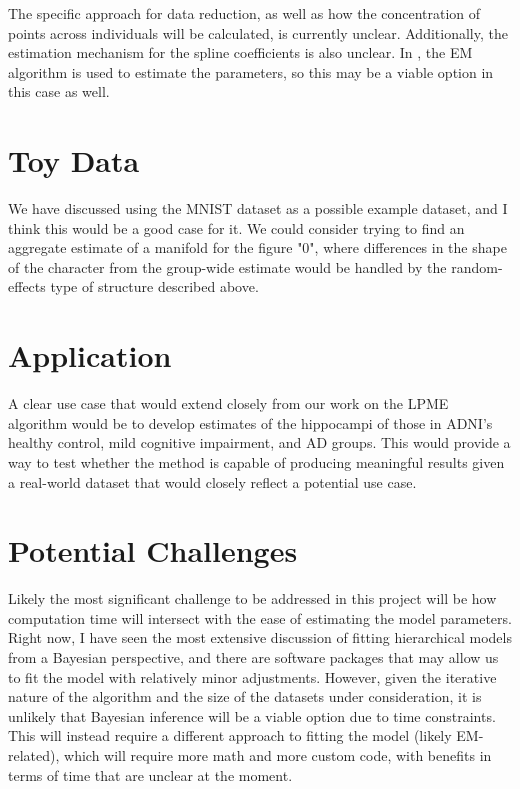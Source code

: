 \documentclass[11pt, reqno]{article}
\begin{document}
The specific approach for data reduction, as well as how the concentration of points across individuals will be calculated, is currently unclear. Additionally, the estimation mechanism for the spline coefficients is also unclear. In \cite{schulamIntegrativeAnalysisUsing2016}, the EM algorithm is used to estimate the parameters, so this may be a viable option in this case as well.

\section{Toy Data}

We have discussed using the MNIST dataset as a possible example dataset, and I think this would be a good case for it. We could consider trying to find an aggregate estimate of a manifold for the figure "0", where differences in the shape of the character from the group-wide estimate would be handled by the random-effects type of structure described above. 

\section{Application}

A clear use case that would extend closely from our work on the LPME algorithm would be to develop estimates of the hippocampi of those in ADNI's healthy control, mild cognitive impairment, and AD groups. This would provide a way to test whether the method is capable of producing meaningful results given a real-world dataset that would closely reflect a potential use case.

\section{Potential Challenges}

Likely the most significant challenge to be addressed in this project will be how computation time will intersect with the ease of estimating the model parameters. Right now, I have seen the most extensive discussion of fitting hierarchical models from a Bayesian perspective, and there are software packages that may allow us to fit the model with relatively minor adjustments. However, given the iterative nature of the algorithm and the size of the datasets under consideration, it is unlikely that Bayesian inference will be a viable option due to time constraints. This will instead require a different approach to fitting the model (likely EM-related), which will require more math and more custom code, with benefits in terms of time that are unclear at the moment.
\end{document}
